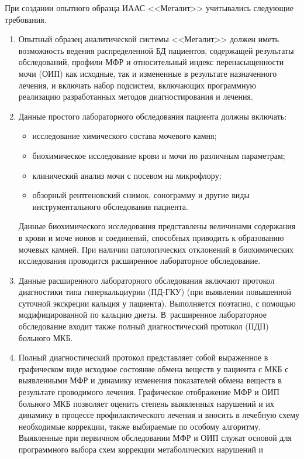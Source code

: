 \begin{multicols}{2}
        При создании опытного образца ИААС <<Мегалит>> учитывались следующие 
требования.
      \begin{enumerate}[1.]
\item Опытный образец аналитической системы <<Мегалит>> должен иметь возможность 
ведения распределенной БД пациентов, содержащей результаты обследований, профили 
МФР и относительный индекс перенасыщенности мочи (ОИП) как 
исходные, так и измененные в результате назначенного лечения, и включать набор подсистем, 
вклю\-ча\-ющих программную реализацию разработанных методов диагностирования и лечения.
\item Данные простого лабораторного обследования пациента должны включать: 
\begin{itemize}
\item исследование химического состава мочевого камня; 
\item биохимическое исследование крови и мочи по различным параметрам; 
\item клинический анализ мочи с посевом на мик\-ро\-флору; 
\item обзорный рентгеновский снимок, сонограмму и другие виды инструментального 
обследования пациента.
\end{itemize}
       Данные биохимического исследования представлены величинами содержания в крови 
и моче ионов и соединений, способных приводить к образованию мочевых камней. При 
наличии патологических отклонений в биохимических исследования проводится расширенное 
лабораторное обследование.
 \item Данные расширенного лабораторного обследования включают протокол диагностики 
типа гиперкальциурии (ПД-ГКУ) (при выявлении повышен\-ной суточной экскреции кальция у 
пациента). Выполняется поэтапно, с помощью модифицированной по кальцию диеты. 
В~расширенное лабораторное обследование входит также полный диагностический протокол (ПДП)
больного МКБ. 
\item Полный диагностический протокол пред\-став\-ля\-ет собой выраженное в 
графическом виде исходное состояние обмена веществ у пациента с МКБ с выявленными 
МФР и динамику изменения показателей обмена веществ 
в результате проводимого лечения. Графическое отображение МФР и ОИП больного МКБ 
позволяет оценить степень выявленных нарушений и их динамику в процессе 
профилактического лечения и вносить в лечебную схему необходимые коррекции, также 
выбираемые по особому алгорит\-му. Выявленные при первичном обследовании МФР и ОИП 
служат основой для програм\-мно\-го выбора схем коррекции метаболических нарушений и 

\end{enumerate}
\end{multicols}
